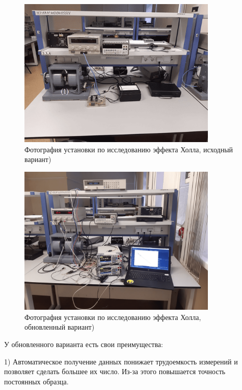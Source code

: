 \documentclass[a4paper,12pt]{article} %
\begin{document}
\begin{figure}[h!]
\begin{center}
\includegraphics[width=0.85\textwidth]{старая_картинка}
\caption{Фотография установки по исследованию эффекта Холла, исходный вариант)} \label{старое_фото}
\end{center}
\end{figure}

\begin{figure}[h!]
\begin{center}
\includegraphics[width=0.85\textwidth]{новая_картинка}
\caption{Фотография установки по исследованию эффекта Холла, обновленный вариант)} \label{новое_фото}
\end{center}
\end{figure}


У обновленного варианта есть свои преимущества: 

1) Автоматическое получение данных понижает трудоемкость измерений и позволяет сделать большее их число. Из-за этого повышается точность постоянных образца. 
\end{document}
